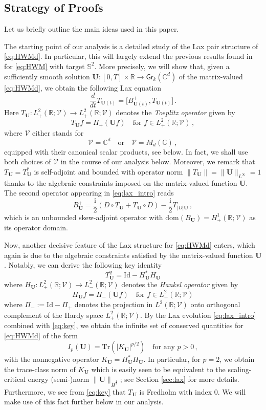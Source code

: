 \documentclass[11pt,reqno]{amsart}
\theoremstyle{definition}
\theoremstyle{remark}
\theoremstyle{remark}
\numberwithin{equation}{section}
\newcommand{\C}{\mathbb{C}}
\newcommand{\R}{\mathbb{R}}
\newcommand{\Ss}{\mathbb{S}}
\newcommand{\VV}{\mathcal{V}}
\newcommand{\dom}{\mathrm{dom}}
\newcommand{\be}{\begin{equation}}
\newcommand{\ee}{\end{equation}}
\newcommand{\ii}{\mathrm{i}}
\newcommand{\Ub}{\mathbf{U}}
\newcommand{\id}{\mathrm{Id}}
\newcommand{\Tr}{\mathrm{Tr}}
\newcommand{\Gr}{\mathsf{Gr}}
\begin{document}
\subsection*{Strategy of Proofs}
   
Let us briefly outline the main ideas used in this paper.
 
The starting point of our analysis is a detailed study of the Lax pair structure of \eqref{eq:HWMd}. In particular, this will largely extend the previous results found in \cite{GeLe-18} for \eqref{eq:HWM} with target $\Ss^2$. More precisely, we will show that, given a sufficiently smooth solution $\Ub : [0,T] \times \R \to \Gr_k(\C^d)$ of the matrix-valued \eqref{eq:HWMd}, we obtain the following Lax equation 
\be \label{eq:lax_intro}
\frac{d}{dt} T_{\Ub(t)} =  \big [B^+_{\Ub(t)}, T_{\Ub(t)} \big ] \, .
\ee     
Here $T_\Ub : L^2_+(\R; \VV) \to L^2_+(\R;\VV)$ denotes the {\em Toeplitz operator} given by
$$
T_{\Ub} f = \Pi_+( \Ub f) \quad \mbox{for $f \in L^2_+(\R; \VV)$}\, ,
$$ 
where $\VV$ either stands for 
$$
\VV=\C^d \quad \mbox{or} \quad \VV=M_d(\C) \, ,
$$ 
equipped with their canonical scalar products, see below. In fact, we shall use both choices of $\VV$ in the course of our analysis below. Moreover, we remark that $T_{\Ub} = T_{\Ub}^*$ is self-adjoint and bounded with operator norm $\| T_\Ub \| = \| \Ub \|_{L^\infty}=1$ thanks to the algebraic constraints imposed on the matrix-valued function $\Ub$. The second operator appearing in \eqref{eq:lax_intro} reads
\be
B^+_\Ub = \frac{\ii}{2} \left ( D \circ T_\Ub + T_{\Ub} \circ D \right ) - \frac{\ii}{2}  T_{|D| \Ub} \, ,
\ee
which is an unbounded skew-adjoint operator with  $\dom(B_\Ub) = H^1_+(\R; \VV)$ as its operator domain. 

Now, another decisive feature of the Lax structure for \eqref{eq:HWMd} enters, which again is due to the algebraic constraints satisfied by the matrix-valued function $\Ub$. Notably, we can derive the following key identity
\be \label{eq:key}
\boxed{ T_{\Ub}^2 = \id - H_{\Ub}^* H_{\Ub}}
\ee 
where $H_\Ub : L^2_+(\R; \VV) \to L^2_-(\R; \VV)$ denotes the {\em Hankel operator} given by
$$
H_{\Ub} f = \Pi_- (\Ub f) \quad \mbox{for $f \in L^2_+(\R; \VV)$}
$$
where $\Pi_- := \id-\Pi_+$ denotes the projection in $L^2(\R;\VV)$ onto orthogonal complement of the Hardy space $L^2_+(\R; \VV)$. By the Lax evolution \eqref{eq:lax_intro} combined with \eqref{eq:key}, we obtain the infinite set of conserved quantities for \eqref{eq:HWMd} of the form
\be
I_p(\Ub) = \Tr(|K_{\Ub}|^{p/2}) \quad \mbox{for any $p >0$} \, ,
\ee  
with the nonnegative operator $K_\Ub = H_{\Ub}^* H_{\Ub}$. In particular, for $p=2$, we obtain the trace-class norm of $K_\Ub$ which is easily seen to be equivalent to the scaling-critical energy (semi-)norm $\| \Ub \|_{\dot{H}^{\frac{1}{2}}}$; see Section \ref{sec:lax} for more details. Furthermore, we see from \eqref{eq:key} that $T_{\Ub}$ is Fredholm with index 0. We will make use of this fact further below in our analysis.
\end{document}

